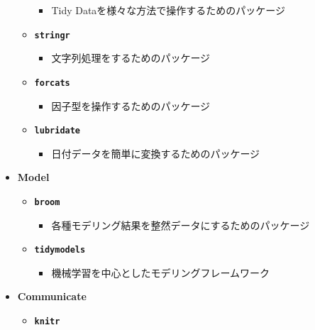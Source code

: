 \documentclass[
  12pt,
]{book}
\providecommand{\tightlist}{%
  \setlength{\itemsep}{0pt}\setlength{\parskip}{0pt}}
\begin{document}
\begin{itemize}
\begin{itemize}
    \begin{itemize}
    \tightlist
    \item
      Tidy Dataを様々な方法で操作するためのパッケージ
    \end{itemize}
  \item
    \textbf{\texttt{stringr}} \citep{R-stringr}

    \begin{itemize}
    \tightlist
    \item
      文字列処理をするためのパッケージ
    \end{itemize}
  \item
    \textbf{\texttt{forcats}} \citep{R-forcats}

    \begin{itemize}
    \tightlist
    \item
      因子型を操作するためのパッケージ
    \end{itemize}
  \item
    \textbf{\texttt{lubridate}} \citep{R-lubridate}

    \begin{itemize}
    \tightlist
    \item
      日付データを簡単に変換するためのパッケージ
    \end{itemize}
  \end{itemize}
\item
  \textbf{Model}

  \begin{itemize}
  \tightlist
  \item
    \textbf{\texttt{broom}} \citep{R-broom}

    \begin{itemize}
    \tightlist
    \item
      各種モデリング結果を整然データにするためのパッケージ
    \end{itemize}
  \item
    \textbf{\texttt{tidymodels}}\citep{tidymodels2020, R-tidymodels}

    \begin{itemize}
    \tightlist
    \item
      機械学習を中心としたモデリングフレームワーク
    \end{itemize}
  \end{itemize}
\item
  \textbf{Communicate}

  \begin{itemize}
  \tightlist
  \item
    \textbf{\texttt{knitr}} \citep{knitr2014, R-knitr}


\end{itemize}
\end{itemize}
\end{document}
